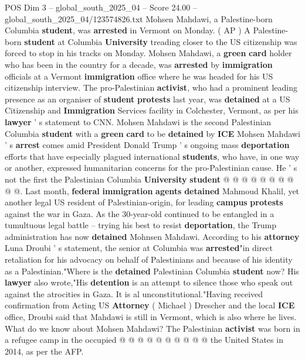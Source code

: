 \begin{textsample}{POS Dim 3 – global\_south\_2025\_04 – Score 24.00 – global\_south\_2025\_04/123574826.txt}  \label{ex:f3_pos_113}
Mohsen Mahdawi, a Palestine-born Columbia \textbf{student}, was \textbf{arrested} in Vermont on Monday. ( AP ) A Palestine-born \textbf{student} at Columbia \textbf{University} treading closer to the US citizenship was forced to stop in his tracks on Monday.
Mohsen Mahdawi, a \textbf{green} \textbf{card} holder who has been in the country for a decade, was \textbf{arrested} by \textbf{immigration} officials at a Vermont \textbf{immigration} office where he was headed for his US citizenship interview.
The pro-Palestinian \textbf{activist}, who had a prominent leading presence as an organiser of \textbf{student} \textbf{protests} last year, was \textbf{detained} at a US Citizenship and \textbf{Immigration} Services facility in Colchester, Vermont, as per his \textbf{lawyer} ' s statement to CNN.
Mohsen Mahdawi is the second Palestinian Columbia \textbf{student} with a \textbf{green} \textbf{card} to be \textbf{detained} by \textbf{ICE} Mohsen Mahdawi ' s \textbf{arrest} comes amid President Donald Trump ' s ongoing mass \textbf{deportation} efforts that have especially plagued international \textbf{students}, who have, in one way or another, expressed humanitarian concerns for the pro-Palestinian cause.
He ' s not the first the Palestinian Columbia \textbf{University} \textbf{student} @ @ @ @ @ @ @ @ @ @.
Last month, \textbf{federal} \textbf{immigration} \textbf{agents} \textbf{detained} Mahmoud Khalil, yet another legal US resident of Palestinian-origin, for leading \textbf{campus} \textbf{protests} against the war in Gaza.
As the 30-year-old continued to be entangled in a tumultuous legal battle -- trying his best to resist \textbf{deportation}, the Trump administration has now \textbf{detained} Mohnsen Mahdawi.
According to his \textbf{attorney} Luna Droubi ' s statement, the senior at Columbia was \textbf{arrested}"in direct retaliation for his advocacy on behalf of Palestinians and because of his identity as a Palestinian."Where is the \textbf{detained} Palestinian Columbia \textbf{student} now?
His \textbf{lawyer} also wrote,"His \textbf{detention} is an attempt to silence those who speak out against the atrocities in Gaza.
It is al unconstitutional."Having received confirmation from Acting US \textbf{Attorney} ( Michael ) Drescher and the local \textbf{ICE} office, Droubi said that Mahdawi is still in Vermont, which is also where he lives.
What do we know about Mohsen Mahdawi?
The Palestinian \textbf{activist} was born in a refugee camp in the occupied @ @ @ @ @ @ @ @ @ @ the United States in 2014, as per the AFP.

\end{textsample}
